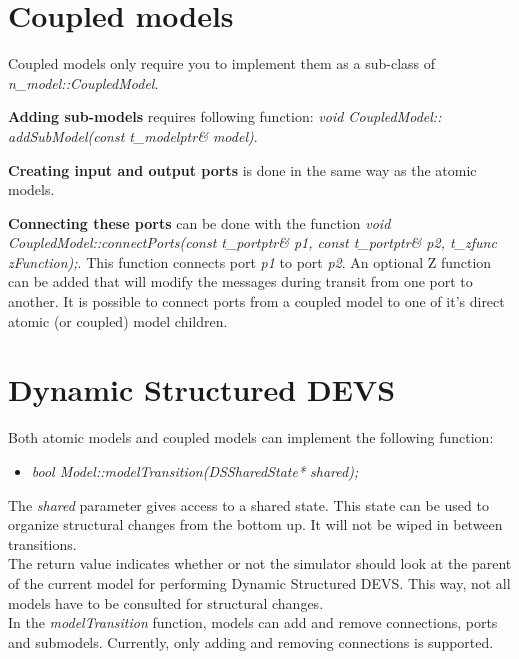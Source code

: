 \section{Coupled models}
Coupled models only require you to implement them as a sub-class of \\ \textsl{n\_model::CoupledModel}.

\textbf{Adding sub-models} requires following function: \textsl{void CoupledModel:: \\addSubModel(const t\_modelptr\& model)}.

\textbf{Creating input and output ports} is done in the same way as the atomic models.

\textbf{Connecting these ports} can be done with the function \textsl{void CoupledModel::connectPorts(const t\_portptr\& p1, const t\_portptr\& p2, t\_zfunc zFunction);}. This function connects port \textsl{p1} to port \textsl{p2}. An optional Z function can be added that will modify the messages during transit from one port to another.
It is possible to connect ports from a coupled model to one of it's direct atomic (or coupled) model children.

\section{Dynamic Structured DEVS}
Both atomic models and coupled models can implement the following function:
\begin{itemize}
	\item \textsl{bool Model::modelTransition(DSSharedState* shared);}
\end{itemize}
The \textsl{shared} parameter gives access to a shared state. This state can be used to organize structural changes from the bottom up. It will not be wiped in between transitions.\\
The return value indicates whether or not the simulator should look at the parent of the current model for performing Dynamic Structured DEVS. This way, not all models have to be consulted for structural changes.\\
In the \textsl{modelTransition} function, models can add and remove connections, ports and submodels. Currently, only adding and removing connections is supported.